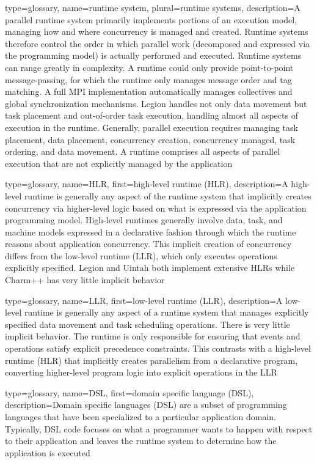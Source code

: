 {
  type=glossary,
  name={runtime system},
  plural={runtime systems},
  description={A parallel runtime system primarily implements portions of an
  \gls{execution model}, managing how and where concurrency is managed and created. 
 Runtime systems therefore control the order in which parallel work (decomposed
     and expressed via the \gls{programming model}) is actually performed and executed.  Runtime systems can range greatly in complexity. A runtime could only provide point-to-point message-passing, for which the runtime only manages message order and tag matching. A full \gls{MPI} implementation automatically manages collectives and global synchronization mechanisms.
  Legion handles not only data movement but task placement and out-of-order task execution, handling almost all aspects of execution in the runtime.  Generally, parallel execution requires managing task placement, data placement, concurrency creation, concurrency managed, task ordering, and data movement. A runtime comprises all aspects of parallel execution that are not explicitly managed by the application}
}

{
  type=glossary,
  name={HLR},
  first={high-level runtime (HLR)},
  description={A high-level runtime is generally any aspect of the runtime system that implicitly creates concurrency via higher-level logic based on what is expressed via the application programming model.  High-level runtimes generally involve data, task, and machine models expressed in a \gls{declarative} fashion through which the runtime reasons about application concurrency. This implicit creation of concurrency differs from the low-level runtime (\gls{LLR}), which only executes operations explicitly specified.  Legion and Uintah both implement extensive HLRs while Charm++ has very little implicit behavior}
}

{
  type=glossary,
  name={LLR},
  first={low-level runtime (LLR)},
  description={A low-level runtime is generally any aspect of a \gls{runtime system} that manages explicitly specified data movement and task scheduling operations. There is very little implicit behavior. The runtime is only responsible for ensuring that events and operations satisfy explicit precedence constraints. This contrasts with a high-level runtime (\gls{HLR}) that implicitly creates parallelism from a declarative program, converting higher-level program logic into explicit operations in the LLR}
}

{
  type=glossary,
  name={DSL},
  first={domain specific language (DSL)},
  description={Domain specific languages (DSL) are a subset of
    \glspl{programming language} that have been specialized to a particular
      application domain. Typically, DSL code focuses on what a programmer
      wants to happen with respect to their application and leaves the
      \gls{runtime system} to determine how the application is executed}
}

